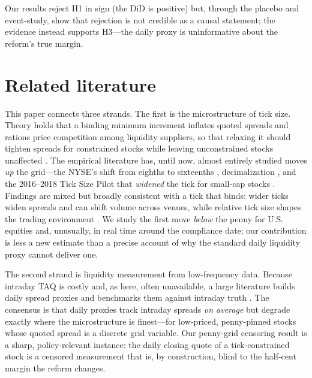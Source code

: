 \documentclass[12pt]{article}
\begin{document}
\noindent Our results reject H1 in sign (the DiD is positive) but, through the placebo and
event-study, show that rejection is not credible as a causal statement; the evidence
instead supports H3---the daily proxy is uninformative about the reform's true margin.

\section{Related literature}\label{sec:lit}
This paper connects three strands. The first is the microstructure of tick size. Theory holds
that a binding minimum increment inflates quoted spreads and rations price competition among
liquidity suppliers, so that relaxing it should tighten spreads for constrained stocks while
leaving unconstrained stocks unaffected \citep{harris1994,foucault2013}. The empirical
literature has, until now, almost entirely studied moves \emph{up} the grid---the NYSE's shift
from eighths to sixteenths \citep{goldstein2000}, decimalization
\citep{bessembinder2003}, and the 2016--2018 Tick Size Pilot that \emph{widened} the tick for
small-cap stocks \citep{ohara2019,comerton2019,albuquerque2020}. Findings are mixed but broadly
consistent with a tick that binds: wider ticks widen spreads and can shift volume across venues,
while relative tick size shapes the trading environment \citep{ohara2019}. We study the first
move \emph{below} the penny for U.S. equities and, unusually, in real time around the compliance
date; our contribution is less a new estimate than a precise account of why the standard daily
liquidity proxy cannot deliver one.

The second strand is liquidity measurement from low-frequency data. Because intraday TAQ is
costly and, as here, often unavailable, a large literature builds daily spread proxies
\citep{corwin2012,chung2014} and benchmarks them against intraday truth \citep{holden2014}. The
consensus is that daily proxies track intraday spreads \emph{on average} but degrade exactly
where the microstructure is finest---for low-priced, penny-pinned stocks whose quoted spread is
a discrete grid variable. Our penny-grid censoring result is a sharp, policy-relevant instance:
the daily closing quote of a tick-constrained stock is a censored measurement that is, by
construction, blind to the half-cent margin the reform changes.
\end{document}
